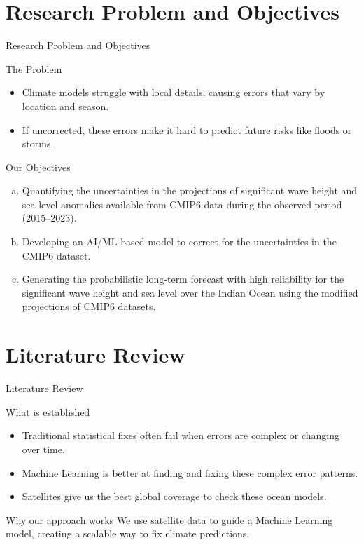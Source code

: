 \documentclass[aspectratio=169]{beamer}
\newcommand{\footerdetails}{}
\newcommand{\setfooter}[1]{\renewcommand{\footerdetails}{#1}}
\begin{document}
\section{Research Problem and Objectives}
\begin{frame}{Research Problem and Objectives}
  \setfooter{Identifying gaps in CMIP6 and defining project goals}
  \begin{block}{The Problem}
    \begin{itemize}
      \item Climate models struggle with local details, causing errors that vary by location and season.
      \item If uncorrected, these errors make it hard to predict future risks like floods or storms.
    \end{itemize}
  \end{block}
  \begin{block}{Our Objectives}
    \begin{enumerate}[a)]
      \item Quantifying the uncertainties in the projections of significant wave height and sea level anomalies available from CMIP6 data during the observed period (2015--2023).
      \item Developing an AI/ML-based model to correct for the uncertainties in the CMIP6 dataset.
      \item Generating the probabilistic long-term forecast with high reliability for the significant wave height and sea level over the Indian Ocean using the modified projections of CMIP6 datasets.
    \end{enumerate}
  \end{block}
\end{frame}

\section{Literature Review}
\begin{frame}{Literature Review}
  \setfooter{Review of existing bias correction methods and ML applications}
  \begin{block}{What is established}
    \begin{itemize}
      \item Traditional statistical fixes often fail when errors are complex or changing over time.
      \item Machine Learning is better at finding and fixing these complex error patterns.
      \item Satellites give us the best global coverage to check these ocean models.
    \end{itemize}
  \end{block}
  \begin{block}{Why our approach works}
    We use satellite data to guide a Machine Learning model, creating a scalable way to fix climate predictions.
  \end{block}
\end{frame}
\end{document}
